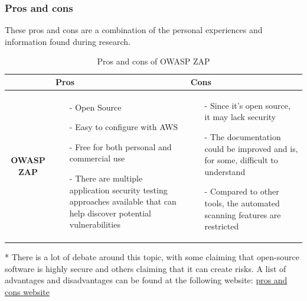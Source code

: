\subsubsection{Pros and cons}
These pros and cons are a combination of the personal experiences and information found during research.\cite{prosconsZAP}
\begin{table}[H]
    \centering
    \begin{threeparttable}
        \begin{tabular}{|c|p{6cm}|p{6cm}|}
            \hline
             & \textbf{Pros} & \textbf{Cons} \\
            \hline
            \textbf{OWASP ZAP} &
            \begin{itemize}
                \item [-]Open Source
                \item [-]Easy to configure with AWS
                \item [-] Free for both personal and commercial use
                \item [-]There are multiple application security testing approaches available that can help discover potential vulnerabilities
            \end{itemize}
            & 
            \begin{itemize}
                \item [-] Since it's open source, it may lack security\tnote{*}
                \item [-] The documentation could be improved and is, for some, difficult to understand
                \item [-]Compared to other tools, the automated scanning features are restricted
            \end{itemize}
            \\
            \hline
        \end{tabular}
        \begin{tablenotes}
            \item[*] There is a lot of debate around this topic,  with some claiming that open-source software is highly secure and others claiming that it can create risks. A list of advantages and disadvantages can be found at the following website: \href{https://cybersecuritynews.com/pros-and-cons-of-using-open-source-software/}{pros and cons website}
            \caption{Pros and cons of OWASP ZAP}
        \end{tablenotes}
    \end{threeparttable}
\end{table}


